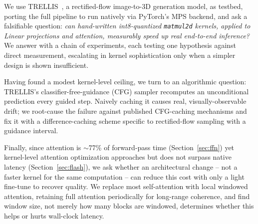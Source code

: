 \documentclass{article}
\newcommand{\code}[1]{\texttt{#1}}
\begin{document}
We use TRELLIS~\cite{trellis2024}, a rectified-flow image-to-3D generation model, as testbed,
porting the full pipeline to run natively via PyTorch's MPS backend, and ask a falsifiable
question: \emph{can hand-written int8-quantized \code{matmul2d} kernels, applied to Linear
projections and attention, measurably speed up real end-to-end inference?} We answer with a chain
of experiments, each testing one hypothesis against direct measurement, escalating in kernel
sophistication only when a simpler design is shown insufficient.

Having found a modest kernel-level ceiling, we turn to an algorithmic question: TRELLIS's
classifier-free-guidance (CFG) sampler recomputes an unconditional prediction every guided step.
Naively caching it causes real, visually-observable drift; we root-cause the failure against
published CFG-caching mechanisms and fix it with a difference-caching scheme specific to
rectified-flow sampling with a guidance interval.

Finally, since attention is $\sim$77\% of forward-pass time (Section~\ref{sec:ffn}) yet
kernel-level attention optimization approaches but does not surpass native latency
(Section~\ref{sec:flash}), we ask whether an architectural change -- not a faster kernel for the
same computation -- can reduce this cost with only a light fine-tune to recover quality. We replace
most self-attention with local windowed attention, retaining full attention periodically for
long-range coherence, and find window size, not merely how many blocks are windowed, determines
whether this helps or hurts wall-clock latency.
\end{document}
